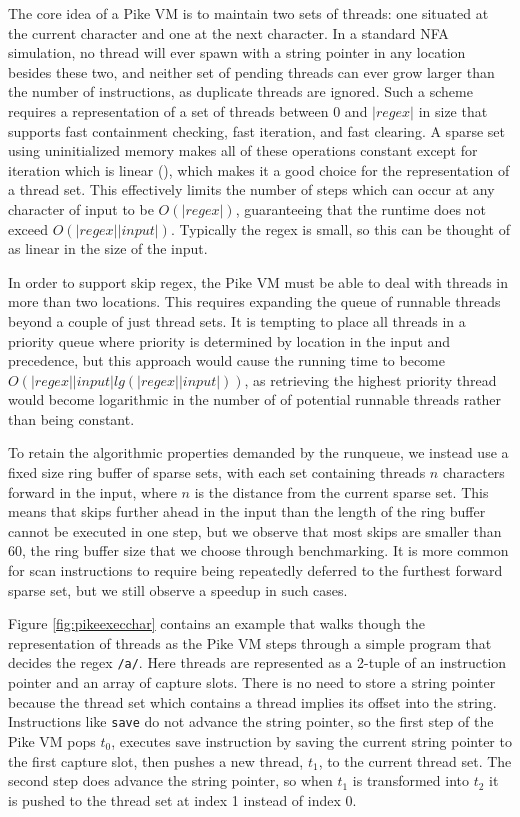 The core idea of a Pike VM is to maintain two sets of threads:
one situated at the current character and one at the next character.
In a standard NFA simulation, no thread will ever spawn with
a string pointer in any location besides these two, and
neither set of pending threads can ever grow larger than
the number of instructions, as duplicate threads are ignored.
Such a scheme requires a representation of a set of threads
between $0$ and $|regex|$ in size that supports fast containment
checking, fast iteration, and fast clearing. A sparse set using
uninitialized memory makes all of these operations constant except
for iteration which is linear (\cite{Briggs1993}), which makes it
a good choice for the representation of a thread set. This
effectively limits the number of steps which can occur
at any character of input to be $O(|regex|)$, guaranteeing that
the runtime does not exceed $O(|regex||input|)$. Typically the regex
is small, so this can be thought of as linear in the size of the input.

In order to support skip regex, the Pike VM must be able to deal
with threads in more than two locations. This requires expanding
the queue of runnable threads beyond a couple of just thread sets.
It is tempting to place all threads in a priority queue where
priority is determined by location in the input and precedence,
but this approach would cause the running time to become
$O(|regex||input|lg(|regex||input|))$, as retrieving the highest
priority thread would become logarithmic in the number of
of potential runnable threads rather than being constant.

To retain the algorithmic properties demanded by the runqueue,
we instead use a fixed size ring buffer of sparse sets, with
each set containing threads $n$ characters forward in the input,
where $n$ is the distance from the current sparse set. This means
that skips further ahead in the input than the length of the ring
buffer cannot be executed in one step, but we observe that most
skips are smaller than $60$, the ring buffer size that we choose
through benchmarking. It is more common for scan instructions to
require being repeatedly deferred to the furthest forward sparse set,
but we still observe a speedup in such cases.

Figure \ref{fig:pikeexecchar} contains an example that walks though
the representation of threads as the Pike VM steps through a simple
program that decides the regex \verb'/a/'. Here threads are represented as
a 2-tuple of an instruction pointer and an array of capture slots.
There is no need to store a string pointer because the thread set
which contains a thread implies its offset into the string.
Instructions like \verb'save' do not advance the string pointer,
so the first step of the Pike VM pops $t_0$, executes save instruction
by saving the current string pointer to the first capture slot, then
pushes a new thread, $t_1$, to the current thread set. The second step
does advance the string pointer, so when $t_1$ is transformed into $t_2$
it is pushed to the thread set at index 1 instead of index 0.

